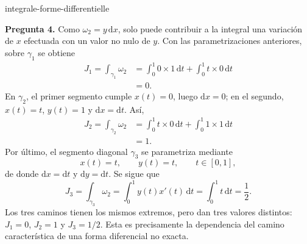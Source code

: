 \begin{exo}{integrale-forme-differentielle}
\begin{solution}
\textbf{Pregunta 4.} Como $\omega_2=y\,\mathrm{d}x$, solo puede contribuir a
la integral una variación de $x$ efectuada con un valor no nulo de $y$. Con las
parametrizaciones anteriores, sobre $\gamma_1$ se obtiene
\[
\begin{aligned}J_1=\int_{\gamma_1}\omega_2
&=\int_0^1 0\times1\,\mathrm{d}t+\int_0^1t\times0\,\mathrm{d}t\\&=0.\end{aligned}
\]
En $\gamma_2$, el primer segmento cumple $x(t)=0$, luego $\mathrm{d}x=0$; en
el segundo, $x(t)=t$, $y(t)=1$ y $\mathrm{d}x=\mathrm{d}t$. Así,
\[
\begin{aligned}J_2=\int_{\gamma_2}\omega_2
&=\int_0^1 t\times0\,\mathrm{d}t+\int_0^1 1\times1\,\mathrm{d}t\\&=1.\end{aligned}
\]
Por último, el segmento diagonal $\gamma_3$ se parametriza mediante
\[x(t)=t,\qquad y(t)=t,\qquad t\in[0,1],\]
de donde $\mathrm{d}x=\mathrm{d}t$ y $\mathrm{d}y=\mathrm{d}t$. Se sigue que
\[J_3=\int_{\gamma_3}\omega_2=\int_0^1 y(t)x'(t)\,\mathrm{d}t=\int_0^1 t\,\mathrm{d}t=\frac12.\]
Los tres caminos tienen los mismos extremos, pero dan tres valores distintos:
$J_1=0$, $J_2=1$ y $J_3=1/2$. Esta es precisamente la dependencia del camino
característica de una forma diferencial no exacta.
\end{solution}
\end{exo}


